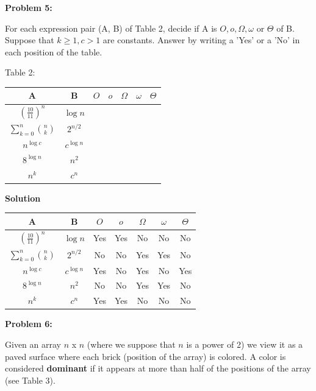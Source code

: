 \documentclass[12pt]{article}
\begin{document}
\begin{center}
\textbf{Problem 5:}
\end{center}
For each expression pair (A, B) of Table 2, decide if A is $O, o, \Omega, \omega$ or $\Theta$ of B. Suppose that $ k \geq 1, c > 1$ are constants. Answer by writing a 'Yes' or a 'No' in each position of the table.
\begin{center}
Table 2:
\end{center}
\begin{center}
\begin{tabular}{| c c | c | c | c | c | c |}
\hline
A & B & $O$ & $o$ & $\Omega$ & $\omega$ & $\Theta$ \\
\hline
$(\frac{10}{11})^n$ & $\log n$ &&&&&\\
\hline
$\sum_{k=0}^{n} {n\choose k}$ & $2^{n/2}$ &&&&&\\
\hline
$n^{\log c}$ & $c^{\log n}$ &&&&&\\
\hline
$8^{\log n}$ & $n^2$ &&&&&\\
\hline
$n^k$ & $c^n$ &&&&&\\
\hline
\end{tabular}
\end{center} 
\begin{center}
\textbf{Solution}
\end{center}
\begin{center}
\begin{tabular}{| c c | c | c | c | c | c |}
\hline
A & B & $O$ & $o$ & $\Omega$ & $\omega$ & $\Theta$ \\
\hline
$(\frac{10}{11})^n$ & $\log n$ & Yes & Yes & No & No & No\\
\hline
$\sum_{k=0}^{n} {n\choose k}$ & $2^{n/2}$ & No & No & Yes & Yes & No\\
\hline
$n^{\log c}$ & $c^{\log n}$ & Yes & No & Yes & No & Yes\\
\hline
$8^{\log n}$ & $n^2$ & No & No & Yes & Yes & No\\
\hline
$n^k$ & $c^n$ & Yes & Yes & No & No & No \\
\hline
\end{tabular}
\end{center} 

\begin{center}
\textbf{Problem 6:}
\end{center}
Given an array $n$ x $n$ (where we suppose that $n$ is a power of 2) we view it as a paved surface where each brick (position of the array) is colored. A color is considered \textbf{dominant} if it appears at more than half of the positions of the array (see Table 3).
\end{document}
